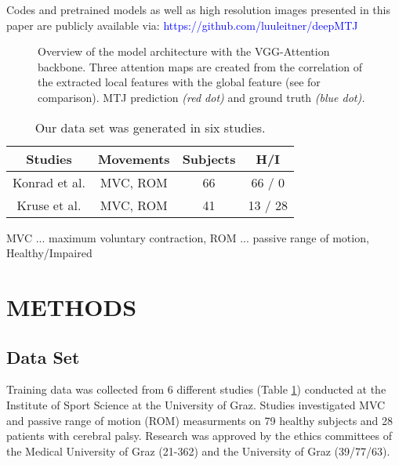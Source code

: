 \documentclass[letterpaper, 10 pt, conference]{ieeeconf}
\begin{document}
Codes and pretrained models as well as high resolution images presented in this paper are publicly available via: \textcolor{blue}{https://github.com/luuleitner/deepMTJ}
\begin{figure*}[thpb]
  \centering
  \caption{Overview of the model architecture with the VGG-Attention backbone. Three attention maps are created from the correlation of the extracted local features with the global feature (see \cite{Attention} for comparison). MTJ prediction \textit{(red dot)} and ground truth \textit{(blue dot).}}
  \label{fig:model}
\end{figure*}
\begin{table}[h]
\caption{Our data set was generated in six studies.}
\label{tab:studies}
\begin{center}
\renewcommand{\arraystretch}{1.20}
\begin{tabular}{cccc}
\toprule
\textbf{Studies}       & \textbf{Movements} & \textbf{Subjects} & \textbf{H/I} \\ 
\midrule
Konrad et al. \cite{j:Konrad2014:1,j:Konrad2015,j:Konrad2014:2} & MVC, ROM  & 66       & 66 / 0     \\
Kruse et al. \cite{j:Kruse2017,j:Kruse2018,j:Kruse2019}  & MVC, ROM  & 41       & 13 / 28            \\ 
\bottomrule
\end{tabular}
 \begin{tablenotes}
    \item MVC ... maximum voluntary contraction, ROM ... passive range of motion,  Healthy/Impaired 
    \end{tablenotes}
\end{center}
\end{table}
\section{METHODS} 
\label{sect:methods}
\subsection{Data Set}
Training data was collected from 6 different studies (Table \ref{tab:studies}) conducted at the Institute of Sport Science at the University of Graz. Studies investigated MVC and passive range of motion (ROM) measurments on 79 healthy subjects and 28 patients with cerebral palsy. Research was approved by the ethics committees of the Medical University of Graz (21-362) and the University of Graz (39/77/63). 
\end{document}

